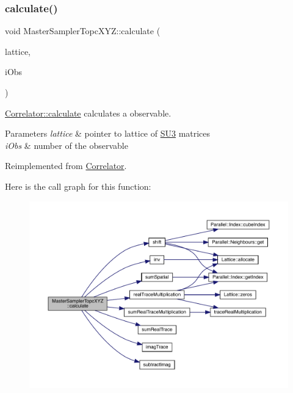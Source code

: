 \subsubsection{\texorpdfstring{calculate()}{calculate()}}
{\footnotesize\ttfamily void Master\+Sampler\+Topc\+X\+Y\+Z\+::calculate (\begin{DoxyParamCaption}\item[{\mbox{\hyperlink{class_lattice}{Lattice}}$<$ \mbox{\hyperlink{class_s_u3}{S\+U3}} $>$ $\ast$}]{lattice,  }\item[{unsigned int}]{i\+Obs }\end{DoxyParamCaption})\hspace{0.3cm}{\ttfamily [virtual]}}



\mbox{\hyperlink{class_correlator_ab33502ff305f891c5c2e6d66a26a0247}{Correlator\+::calculate}} calculates a observable. 


\begin{DoxyParams}{Parameters}
{\em lattice} & pointer to lattice of \mbox{\hyperlink{class_s_u3}{S\+U3}} matrices \\
\hline
{\em i\+Obs} & number of the observable \\
\hline
\end{DoxyParams}


Reimplemented from \mbox{\hyperlink{class_correlator_ab33502ff305f891c5c2e6d66a26a0247}{Correlator}}.

Here is the call graph for this function\+:
\nopagebreak
\begin{figure}[H]
\begin{center}
\leavevmode
\includegraphics[width=350pt]{class_master_sampler_topc_x_y_z_a0ea80ad9935db791f00461b7dfd548b7_cgraph}
\end{center}
\end{figure}
\mbox{\label{class_master_sampler_topc_x_y_z_a49ef8ccce4bf9473017bbb7c01f1404b}} 
